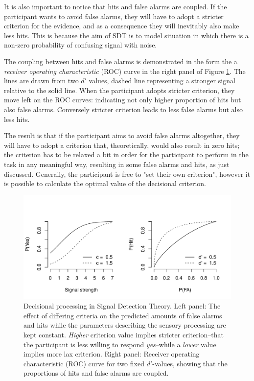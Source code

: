\documentclass{article}\usepackage{knitr}
\begin{document}
It is also important to notice that hits and false alarms are coupled. If the participant wants to avoid false alarms, they will have to adopt a stricter criterion for the evidence, and  as a consequence they  will inevitably also make less hits. This is because the aim of SDT is to model situation in which there is a non-zero probability of confusing signal with noise. 

The coupling between hits and false alarms is demonstrated in the form the a \textit{receiver operating characteristic} (ROC) curve \cite[161]{kingdomprins2010} in the right panel of Figure \ref{fig:critchange}. The lines are drawn from two $d'$ values, dashed line representing a stronger signal relative to the solid line. When the participant adopts stricter criterion, they move left on the ROC curves: indicating not only higher proportion of hits but also false alarms. Conversely stricter criterion leads to less false alarms but also less hits.

The result is that if the participant aims to avoid false alarms altogether, they will have to adopt a criterion that, theoretically, would also result in zero hits; the criterion has to be relaxed a bit in order for the participant to perform in the task in any meaningful way, resulting in some false alarms and hits, as just discussed. Generally, the participant is free to "set their own criterion", however it is possible to calculate the optimal value of the decisional criterion. 

\begin{figure}[!htb]
\begin{center}
\begin{knitrout}
\color{fgcolor}
\includegraphics[width=\maxwidth]{figure/unnamed-chunk-5-1} 

\end{knitrout}
\end{center}
\caption{ Decisional processing in Signal Detection Theory. Left panel: The effect of differing criteria on the predicted amounts of false alarms and hits while the parameters describing the sensory processing are kept constant. \textit{Higher} criterion value implies stricter criterion--that the participant is less willing to respond \textit{yes}--while a \textit{lower} value implies more lax criterion. Right panel: Receiver operating characteristic (ROC) curve for two fixed $d'$-values, showing that the proportions of hits and false alarms are coupled.}
\label{fig:critchange}
\end{figure}
\end{document}
